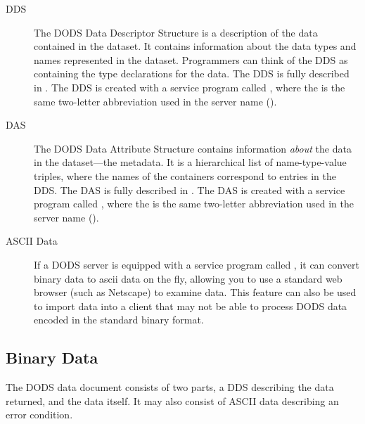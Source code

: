 \begin{description}
\item[DDS] 
  
  The DODS Data Descriptor Structure is a description of the data
  contained in the dataset.  It contains information about the data
  types and names represented in the dataset.  Programmers can think
  of the DDS as containing the type declarations for the data.  The
  DDS is fully described in \OPDuser .  The DDS is created with a
  service program called , where the \lit{*} is the same
  two-letter abbreviation used in the server name ().


\item[DAS] 
  
  The DODS Data Attribute Structure contains information \emph{about}
  the data in the dataset---the metadata.  It is a hierarchical list
  of name-type-value triples, where the names of the containers
  correspond to entries in the DDS.  The DAS is fully described in
  \OPDuser .  The DAS is created with a service program called
  , where the \lit{*} is the same two-letter abbreviation
  used in the server name ().

\item[ASCII Data] 

  If a DODS server is equipped with a service program called
  , it can convert binary data to ascii data on the fly,
  allowing you to use a standard web browser (such as Netscape) to
  examine data.  This feature can also be used to import data into a
  client that may not be able to process DODS data encoded in the
  standard binary format.

\end{description}

\subsection{Binary Data}
\label{pguide,server,binary}

The DODS data document consists of two parts, a DDS describing the
data returned, and the data itself.  It may also consist of ASCII data
describing an error condition.

